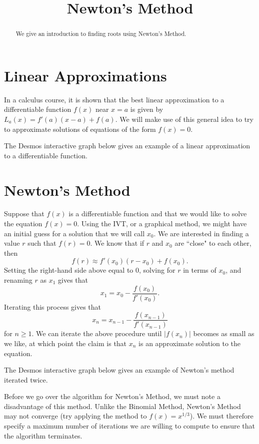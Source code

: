 \documentclass{ximera}
\title{Newton's Method}
\begin{document}
\begin{abstract}
We give an introduction to finding roots using Newton's Method.
\end{abstract}
\maketitle

\section{Linear Approximations}

In a calculus course, it is shown that the best linear approximation to a differentiable function $f(x)$ near $x=a$ is given by $L_a(x)=f'(a)(x-a)+f(a)$. We will make use of this general idea to try to approximate solutions of equations of the form $f(x)=0$.

The Desmos interactive graph below gives an example of a linear approximation to a differentiable function.


\section{Newton's Method}

Suppose that $f(x)$ is a differentiable function and that we would like to solve the equation $f(x)=0$. Using the IVT, or a graphical method, we might have an initial guess for a solution that we will call $x_0$. We are interested in finding a value $r$ such that $f(r)=0$. We know that if $r$ and $x_0$ are ``close" to each other, then $$f(r)\approx f'(x_0)(r-x_0)+f(x_0).$$ Setting the right-hand side above equal to 0, solving for $r$ in terms of $x_0$, and renaming $r$ as $x_1$ gives that $$x_1=x_0-\frac{f(x_0)}{f'(x_0)}.$$ Iterating this process gives that $$x_n=x_{n-1}-\frac{f(x_{n-1})}{f'(x_{n-1})}$$ for $n\geq 1$. We can iterate the above procedure until $|f(x_n)|$ becomes as small as we like, at which point the claim is that $x_n$ is an approximate solution to the equation.

The Desmos interactive graph below gives an example of Newton's method iterated twice.


Before we go over the algorithm for Newton's Method, we must note a disadvantage of this method. Unlike the Binomial Method, Newton's Method may not converge (try applying the method to $f(x)=x^{1/3}$). We must therefore specify a maximum number of iterations we are willing to compute to ensure that the algorithm terminates.
\end{document}
